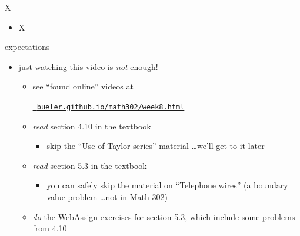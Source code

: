 \documentclass[urlcolor=blue,dvipsnames]{beamer}
\begin{document}
\begin{frame}{X}

\begin{itemize}
\item X
\end{itemize}
\end{frame}


\begin{frame}{expectations}

\begin{itemize}
\item just watching this video is \emph{not} enough!
     \begin{itemize}
     \item see ``found online'' videos at

     \centerline{\href{https://bueler.github.io/math302/week8.html}{\tt \color{cyan} bueler.github.io/math302/week8.html}}
     \item \emph{read} section 4.10 in the textbook
         \begin{itemize}
         \item skip the ``Use of Taylor series'' material \dots we'll get to it later
         \end{itemize}
     \item \emph{read} section 5.3 in the textbook
         \begin{itemize}
         \item you can safely skip the material on ``Telephone wires'' (a boundary value problem \dots not in Math 302)
         \end{itemize}
     \item \emph{do} the WebAssign exercises for section 5.3, which include some problems from 4.10
     \end{itemize}
\end{itemize}
\end{frame}
\end{document}
